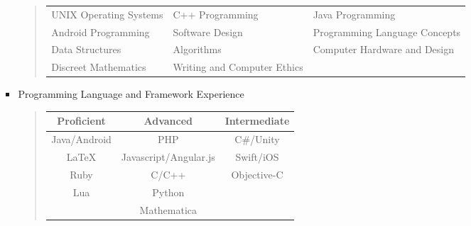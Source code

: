 \begin{enumerate}[label={\Roman*}.]
\begin{itemize}
\begin{itemize}
\begin{quote}
	      	      	      	\def\arraystretch{1.1}
	      	      	      	\begin{tabular}{l l l}
	      	      	      		UNIX Operating Systems & C++ Programming & Java Programming              \\
	      	      	      		Android Programming    & Software Design & Programming Language Concepts \\
	      	      	      		Data Structures        & Algorithms      & Computer Hardware and Design  \\
	      	      	      		Discreet Mathematics & Writing and Computer Ethics
	      	      	      	\end{tabular}
	      	      	      \end{quote}
	      	      	\item Programming Language and Framework Experience
	      	      	      \begin{quote}
	      	      	      	\def\arraystretch{1.1}
	      	      	      	\begin{tabular}{c  c  c}
	      	      	      		\textbf{Proficient} & \textbf{Advanced}     & \textbf{Intermediate} \\
	      	      	      		\hline
	      	      	      		Java/Android        & PHP                   & C\#/Unity             \\
	      	      	      		\LaTeX              & Javascript/Angular.js & Swift/iOS             \\
	      	      	      		Ruby                & C/C++                 & Objective-C           \\
	      	      	      		Lua                 & Python                &                       \\
	      	      	      		                    & Mathematica           &
	      	      	      	\end{tabular}
	      	      	      \end{quote}
	      	      \end{itemize}
	      \end{itemize}
\end{enumerate}
